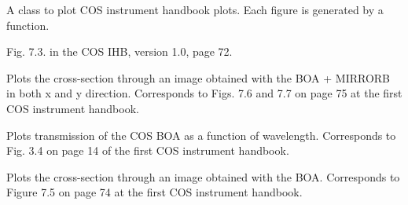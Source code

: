 \documentclass[letterpaper,10pt,english]{sphinxmanual}
\begin{document}

\begin{fulllineitems}
\label{SamPy.plot.COSIHB:SamPy.plot.COSIHB.plotting.Plotting}
A class to plot COS instrument handbook plots.
Each figure is generated by a function.


\begin{fulllineitems}
\label{SamPy.plot.COSIHB:SamPy.plot.COSIHB.plotting.Plotting.AcqImageExposureTimes}
Fig. 7.3. in the COS IHB, version 1.0, page 72.

\end{fulllineitems}



\begin{fulllineitems}
\label{SamPy.plot.COSIHB:SamPy.plot.COSIHB.plotting.Plotting.BOAMIRRORprofile}
Plots the cross-section through an image obtained with the BOA + MIRRORB in both x and y direction.
Corresponds to Figs. 7.6 and 7.7 on page 75 at the first COS instrument handbook.

\end{fulllineitems}



\begin{fulllineitems}
\label{SamPy.plot.COSIHB:SamPy.plot.COSIHB.plotting.Plotting.BOATransmission}
Plots transmission of the COS BOA as a function of wavelength.
Corresponds to Fig. 3.4 on page 14 of the first COS instrument handbook.

\end{fulllineitems}



\begin{fulllineitems}
\label{SamPy.plot.COSIHB:SamPy.plot.COSIHB.plotting.Plotting.BOAprofile}
Plots the cross-section through an image obtained with the BOA.
Corresponds to Figure 7.5 on page 74 at the first COS instrument handbook.


\end{fulllineitems}
\end{fulllineitems}
\end{document}
